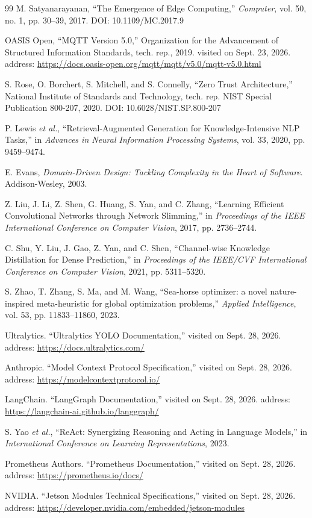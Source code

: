 \begin{thebibliography}{99}
 M. Satyanarayanan, ``The Emergence of Edge Computing,'' \textit{Computer},
vol. 50, no. 1, pp. 30--39, 2017. DOI: 10.1109/MC.2017.9

 OASIS Open, ``MQTT Version 5.0,'' Organization for the Advancement of
Structured Information Standards, tech. rep., 2019. visited on Sept. 23, 2026.
address: \url{https://docs.oasis-open.org/mqtt/mqtt/v5.0/mqtt-v5.0.html}

 S. Rose, O. Borchert, S. Mitchell, and S. Connelly, ``Zero Trust
Architecture,'' National Institute of Standards and Technology, tech. rep.
NIST Special Publication 800-207, 2020. DOI: 10.6028/NIST.SP.800-207

 P. Lewis \textit{et al.}, ``Retrieval-Augmented Generation for
Knowledge-Intensive NLP Tasks,'' in \textit{Advances in Neural Information
Processing Systems}, vol. 33, 2020, pp. 9459--9474.

 E. Evans, \textit{Domain-Driven Design: Tackling Complexity
in the Heart of Software}. Addison-Wesley, 2003.

 Z. Liu, J. Li, Z. Shen, G. Huang, S. Yan, and C. Zhang,
``Learning Efficient Convolutional Networks through Network Slimming,'' in
\textit{Proceedings of the IEEE International Conference on Computer Vision},
2017, pp. 2736--2744.

 C. Shu, Y. Liu, J. Gao, Z. Yan, and C. Shen, ``Channel-wise
Knowledge Distillation for Dense Prediction,'' in \textit{Proceedings of the
IEEE/CVF International Conference on Computer Vision}, 2021, pp. 5311--5320.

 S. Zhao, T. Zhang, S. Ma, and M. Wang, ``Sea-horse
optimizer: a novel nature-inspired meta-heuristic for global optimization
problems,'' \textit{Applied Intelligence}, vol. 53, pp. 11833--11860, 2023.

 Ultralytics. ``Ultralytics YOLO Documentation,'' visited on
Sept. 28, 2026. address: \url{https://docs.ultralytics.com/}

 Anthropic. ``Model Context Protocol Specification,'' visited on
Sept. 28, 2026. address: \url{https://modelcontextprotocol.io/}

 LangChain. ``LangGraph Documentation,'' visited on Sept. 28,
2026. address: \url{https://langchain-ai.github.io/langgraph/}

 S. Yao \textit{et al.}, ``ReAct: Synergizing Reasoning and
Acting in Language Models,'' in \textit{International Conference on Learning
Representations}, 2023.

 Prometheus Authors. ``Prometheus Documentation,'' visited on
Sept. 28, 2026. address: \url{https://prometheus.io/docs/}

 NVIDIA. ``Jetson Modules Technical Specifications,'' visited on
Sept. 28, 2026. address: \url{https://developer.nvidia.com/embedded/jetson-modules}
\end{thebibliography}

